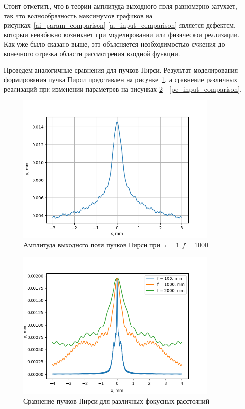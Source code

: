 {    Стоит отметить, что в теории амплитуда выходного поля
    равномерно затухает, так что волнообразность максимумов графиков на
    рисунках~\ref{ai_param_comparison}-\ref{ai_input_comparison} является дефектом,
    который неизбежно возникнет при моделировании или физической реализации. Как уже было сказано выше, это
    объясняется необходимостью сужения до конечного отрезка области
    рассмотрения входной функции.

    Проведем аналогичные сравнения для пучков Пирси. Результат моделирования формирования пучка Пирси представлен на рисунке~\ref{pearceyoutput3},
    а сравнение различных реализаций при изменении параметров на рисунках \ref{pe_focus_comparison} - \ref{pe_input_comparison}.

    \begin{figure}[H]
        \begin{center}
            \includegraphics[width=10cm]{plots/pearceyoutput3}
            \caption{Амплитуда выходного поля пучков Пирси при $ \alpha  = 1, f = 1000$}
            \label{pearceyoutput3}
        \end{center}
    \end{figure}

    \begin{figure}[H]
        \begin{center}
            \includegraphics[width=10cm]{plots/pe_focus_comparison}
            \caption{Сравнение пучков Пирси для различных фокусных расстояний}
            \label{pe_focus_comparison}
        \end{center}
    \end{figure}

}
